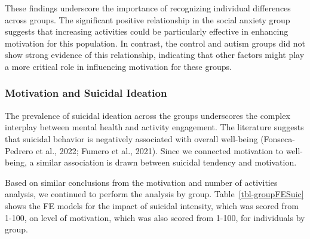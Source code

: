 \documentclass[
  letterpaper,
  number,
  review,
  3p]{elsarticle}
\begin{document}
These findings underscore the importance of recognizing individual
differences across groups. The significant positive relationship in the
social anxiety group suggests that increasing activities could be
particularly effective in enhancing motivation for this population. In
contrast, the control and autism groups did not show strong evidence of
this relationship, indicating that other factors might play a more
critical role in influencing motivation for these groups.

\subsubsection{Motivation and Suicidal
Ideation}\label{motivation-and-suicidal-ideation}

The prevalence of suicidal ideation across the groups underscores the
complex interplay between mental health and activity engagement. The
literature suggests that suicidal behavior is negatively associated with
overall well-being (Fonseca-Pedrero et al., 2022; Fumero et al., 2021).
Since we connected motivation to well-being, a similar association is
drawn between suicidal tendency and motivation.

Based on similar conclusions from the motivation and number of
activities analysis, we continued to perform the analysis by group.
Table~\ref{tbl-groupFESuic} shows the FE models for the impact of
suicidal intensity, which was scored from 1-100, on level of motivation,
which was also scored from 1-100, for individuals by group.

\begin{table}

\caption{\label{tbl-groupFESuic}FE Models: Motivation and Suicidal
Intensity by Group}


\end{table}%
\end{document}
